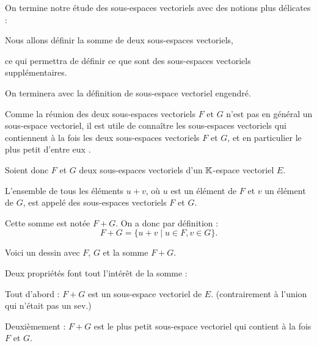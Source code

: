 







\debuttexte


\diapo

\change

On termine notre étude des sous-espaces vectoriels avec des notions plus délicates :

\change

Nous allons définir la somme de deux sous-espaces vectoriels,

\change

ce qui permettra de définir ce que sont des sous-espaces vectoriels supplémentaires.

\change

On terminera avec la définition de sous-espace vectoriel engendré. 



\diapo

Comme la réunion des deux sous-espaces vectoriels $F$ et $G$ 
n'est pas en général un sous-espace vectoriel, il est utile de connaître 
les sous-espaces vectoriels qui contiennent à la fois les deux sous-espaces 
vectoriels $F$ et $G$, et en particulier le plus petit d'entre eux .



Soient donc $F$ et $G$ deux sous-espaces vectoriels d'un $\mathbb{K}$-espace vectoriel $E$. 

L'ensemble de tous les éléments $u+v$, où $u$ est un élément de 
$F$ et $v$ un élément de $G$, est appelé  des sous-espaces vectoriels 
$F$ et $G$. 

\change


Cette somme est notée  $F+G$. On a donc par définition :
$$F+G=\big\{u+v \mid u \in F, v \in G \big\}.$$

\change
Voici un dessin avec $F$, $G$ et la somme $F+G$.

\change

Deux propriétés  font tout l’intérêt de la somme :

Tout d'abord : $F+G$ est un sous-espace vectoriel de $E$. (contrairement à l'union qui n'était pas un sev.)

Deuxièmement : $F+G$ est le plus petit sous-espace vectoriel qui contient à la fois $F$ et $G$.

